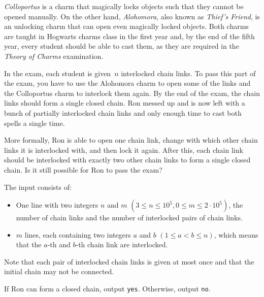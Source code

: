 
\emph{Colloportus} is a charm that magically locks objects such that they cannot be opened manually.
On the other hand, \emph{Alohomora}, also known as \emph{Thief's Friend}, is an unlocking charm that can open even magically locked objects.
Both charms are taught in Hogwarts charms class in the first year and, by the end of the fifth year, every student should be able to cast them, as they are required in the \emph{Theory of Charms} examination.

In the exam, each student is given~$n$ interlocked chain links.
To pass this part of the exam, you have to use the Alohomora charm to open some of the links and the Colloportus charm to interlock them again.
By the end of the exam, the chain links should form a single closed chain.
Ron messed up and is now left with a bunch of partially interlocked chain links and only enough time to cast both spells a single time.

More formally, Ron is able to open one chain link, change with which other chain links it is interlocked with, and then lock it again.
After this, each chain link should be interlocked with exactly two other chain links to form a single closed chain.
Is it still possible for Ron to pass the exam?
		
\begin{Input}
The input consists of:
\begin{itemize}
	\item One line with two integers $n$ and $m$ $(3\leq n \leq10^5, 0\leq m\leq2\cdot10^5)$, the number of chain links and the number of interlocked pairs of chain links.
	\item $m$ lines, each containing two integers $a$ and $b$ $(1\leq a<b\leq n)$, which means that the $a$-th and $b$-th chain link are interlocked.
\end{itemize}
Note that each pair of interlocked chain links is given at most once and that the initial chain may not be connected.
\end{Input}
\begin{Output}
If Ron can form a closed chain, output \texttt{yes}.
Otherwise, output \texttt{no}.
\end{Output}
